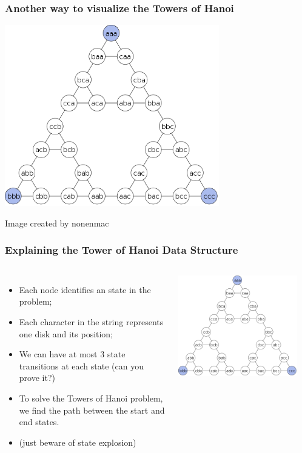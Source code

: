 \documentclass{beamer}
\begin{document}
\begin{frame}
  \frametitle{Another way to visualize the Towers of Hanoi}
  \begin{center}
    \includegraphics[width=0.7\textwidth]{img/hanoi_graph}
  \end{center}
  {\tiny \hfill Image created by nonenmac}
\end{frame}

\begin{frame}
  \frametitle{Explaining the Tower of Hanoi Data Structure}
  \begin{columns}[c]
    \begin{itemize}
    \item Each node identifies an state in the problem;
    \item Each character in the string represents one disk and its
      position;
    \item We can have at most 3 state transitions at each state (can
      you prove it?)
    \item To solve the Towers of Hanoi problem, we find the path
      between the start and end states.
    \item (just beware of state explosion)
    \end{itemize}
    \includegraphics[width=0.9\textwidth]{img/hanoi_graph}
    \vfill
  \end{columns}
\end{frame}
\end{document}
